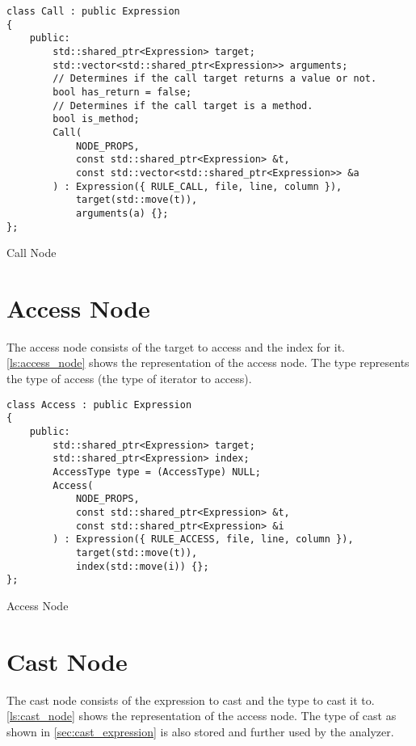 \begin{listing}[H]
\begin{verbatim}
class Call : public Expression
{
    public:
        std::shared_ptr<Expression> target;
        std::vector<std::shared_ptr<Expression>> arguments;
        // Determines if the call target returns a value or not.
        bool has_return = false;
        // Determines if the call target is a method.
        bool is_method;
        Call(
            NODE_PROPS,
            const std::shared_ptr<Expression> &t,
            const std::vector<std::shared_ptr<Expression>> &a
        ) : Expression({ RULE_CALL, file, line, column }),
            target(std::move(t)),
            arguments(a) {};
};
\end{verbatim}
\caption{Call Node}
\label{ls:call_node}
\end{listing}

\section{Access Node}

The access node consists of the target to access and the index for it.
\autoref{ls:access_node} shows the representation of the access node.
The type represents the type of access (the type of iterator to access).

\begin{listing}[H]
\begin{verbatim}
class Access : public Expression
{
    public:
        std::shared_ptr<Expression> target;
        std::shared_ptr<Expression> index;
        AccessType type = (AccessType) NULL;
        Access(
            NODE_PROPS,
            const std::shared_ptr<Expression> &t,
            const std::shared_ptr<Expression> &i
        ) : Expression({ RULE_ACCESS, file, line, column }),
            target(std::move(t)),
            index(std::move(i)) {};
};
\end{verbatim}
\caption{Access Node}
\label{ls:access_node}
\end{listing}

\section{Cast Node}

The cast node consists of the expression to cast and the type to cast it to.
\autoref{ls:cast_node} shows the representation of the access node.
The type of cast as shown in \autoref{sec:cast_expression} is also stored and further used by the analyzer.


